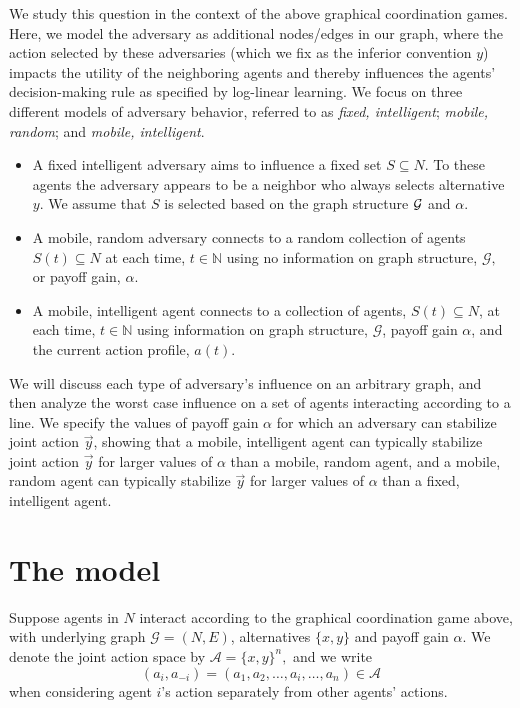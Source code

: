 We study this question in the context of the above graphical coordination games. Here, we model the adversary as additional nodes/edges in our graph, where the action selected by these adversaries (which we fix as the inferior convention $y$) impacts the utility of the neighboring agents and thereby influences the agents' decision-making rule as specified by log-linear learning.  We focus on three different models of adversary behavior, referred to as \emph{fixed, intelligent}; \emph{mobile, random}; and \emph{mobile, intelligent}. 
%
\begin{itemize}
%
\item A fixed intelligent adversary aims to influence a fixed set $S\subseteq N$. To these agents the adversary appears to be a neighbor who always selects alternative  $y$.  We assume that $S$ is selected based on the graph structure ${\cal G}$ and $\alpha$.   
%
\item A mobile, random adversary connects to a random collection of agents $S(t)\subseteq N$ at each time, $t\in \mathbb{N}$ using no information on graph structure, $\mathcal{G},$ or payoff gain, $\alpha.$ 
%
\item A mobile, intelligent agent connects to a collection of agents, $S(t)\subseteq N$, at each time, $t\in \mathbb{N}$ using information on graph structure, $\mathcal{G}$, payoff gain $\alpha$, and the current action profile, $a(t)$.  
%
\end{itemize}
%
We will discuss each type of adversary's influence on an arbitrary graph, and then analyze the worst case influence on a set of agents interacting according to a line. We specify the values of payoff gain $\alpha$ for which an adversary can stabilize joint action $\vec{y}$, showing that a mobile, intelligent agent can typically stabilize joint action $\vec{y}$ for larger values of $\alpha$ than a mobile, random agent, and a mobile, random agent can typically stabilize $\vec{y}$ for larger values of $\alpha$ than a fixed, intelligent agent. 

\section{The model}

Suppose agents in $N$ interact according to the graphical coordination game above, with underlying graph $\mathcal{G} = (N,E)$, alternatives $\{x,y\}$ and payoff gain $\alpha.$ We denote the joint action space by $\mathcal{A} = \{x,y\}^n,$ and we write
$$(a_i,a_{-i}) = (a_1,a_2,\ldots,a_i,\ldots,a_n)\in\mathcal{A}$$
when considering agent $i$'s action separately from other agents' actions.


